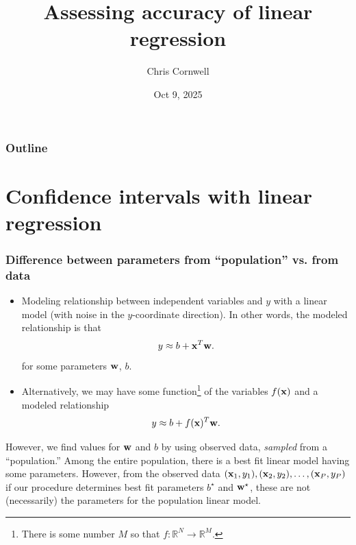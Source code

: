 \documentclass{beamer}
\author{Chris Cornwell}
\date{Oct 9, 2025}
\title{Assessing accuracy of linear regression}
\theoremstyle{example}
\begin{document}
\begin{frame}
\titlepage
\end{frame}

\begin{frame}
\frametitle{Outline}
\tableofcontents
\end{frame}

\section{Confidence intervals with linear regression}

\begin{frame}
\frametitle{Difference between parameters from ``population'' vs. from data}
\begin{itemize}
    \item Modeling relationship between independent variables and $y$ with a linear model (with noise in the $y$-coordinate direction). In other words, the modeled relationship is that
        \[y \approx b + {\bf x}^T{\bf w}.\]
    for some parameters ${\bf w}$, $b$. 
    \pause
    \item Alternatively, we may have some function\footnote{There is some number $M$ so that $f:\mathbb R^N\to\mathbb R^M$.} of the variables $f({\bf x})$ and a modeled relationship 
        \[y \approx b + f({\bf x})^T{\bf w}.\]
\end{itemize}

\pause
However, we find values for ${\bf w}$ and $b$ by using observed data, \emph{sampled} from a ``population.''  Among the entire population, there is a best fit linear model having some parameters. However, from the observed data $({\bf x}_1,y_1), ({\bf x}_2,y_2), \ldots, ({\bf x}_P,y_P)$ if our procedure determines best fit parameters $b^\star$ and ${\bf w}^\star$, these are not (necessarily) the parameters for the population linear model.

\end{frame}
\end{document}
